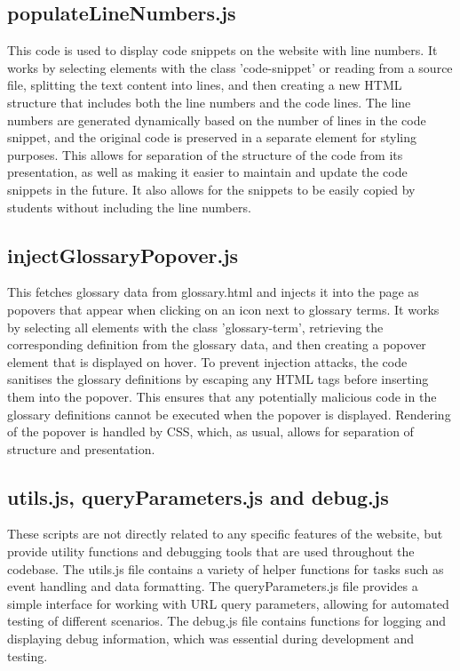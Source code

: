 \documentclass[a4paper, 12pt]{article}
\begin{document}
\subsection{populateLineNumbers.js}
This code is used to display code snippets on the website with line numbers. It works by selecting elements with the class 'code-snippet' or reading from a source file, splitting the text content into lines, and then creating a new HTML structure that includes both the line numbers and the code lines. The line numbers are generated dynamically based on the number of lines in the code snippet, and the original code is preserved in a separate element for styling purposes. This allows for separation of the structure of the code from its presentation, as well as making it easier to maintain and update the code snippets in the future. It also allows for the snippets to be easily copied by students without including the line numbers.

\subsection{injectGlossaryPopover.js}
This fetches glossary data from glossary.html and injects it into the page as popovers that appear when clicking on an icon next to glossary terms. It works by selecting all elements with the class 'glossary-term', retrieving the corresponding definition from the glossary data, and then creating a popover element that is displayed on hover. To prevent injection attacks, the code sanitises the glossary definitions by escaping any HTML tags before inserting them into the popover. This ensures that any potentially malicious code in the glossary definitions cannot be executed when the popover is displayed. Rendering of the popover is handled by CSS, which, as usual, allows for separation of structure and presentation.

\subsection{utils.js, queryParameters.js and debug.js}
These scripts are not directly related to any specific features of the website, but provide utility functions and debugging tools that are used throughout the codebase. The utils.js file contains a variety of helper functions for tasks such as event handling and data formatting. The queryParameters.js file provides a simple interface for working with URL query parameters, allowing for automated testing of different scenarios. The debug.js file contains functions for logging and displaying debug information, which was essential during development and testing.
\end{document}
